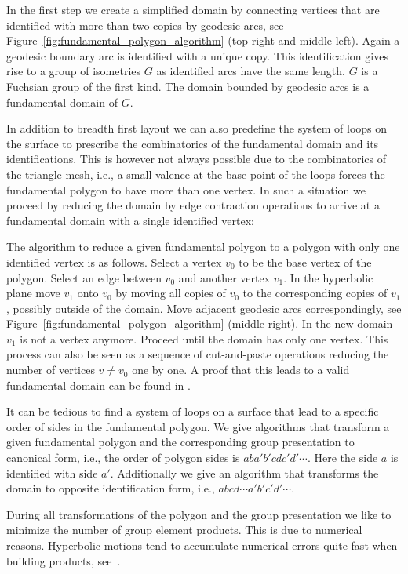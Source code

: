 \documentclass[Thesis]{subfiles}
\begin{document}
In the first step we create a simplified domain by connecting vertices that are identified with more than two copies by geodesic arcs, see Figure~\ref{fig:fundamental_polygon_algorithm} (top-right and middle-left). 
Again a geodesic boundary arc is identified with a unique copy. 
This identification gives rise to a group of isometries $G$ as identified arcs have the same length. 
$G$ is a Fuchsian group of the first kind. 
The domain bounded by geodesic arcs is a fundamental domain of $G$.

In addition to breadth first layout we can also predefine the system of loops on the surface to prescribe the combinatorics of the fundamental domain and its identifications. 
This is however not always possible due to the combinatorics of the triangle mesh, i.e., a small valence at the base point of the loops forces the fundamental polygon to have more than one vertex. 
In such a situation we proceed by reducing the domain by edge contraction operations to arrive at a fundamental domain with a single identified vertex:

The algorithm to reduce a given fundamental polygon to a polygon with only one identified vertex is as follows. 
Select a vertex $v_0$ to be the base vertex of the polygon. 
Select an edge between $v_0$ and another vertex $v_1$. 
In the hyperbolic plane move $v_1$ onto $v_0$ by moving all copies of $v_0$ to the corresponding copies of $v_1$, possibly outside of the domain. 
Move adjacent geodesic arcs correspondingly, see Figure~\ref{fig:fundamental_polygon_algorithm} (middle-right). 
In the new domain $v_1$ is not a vertex anymore. 
Proceed until the domain has only one vertex. 
This process can also be seen as a sequence of cut-and-paste operations reducing the number of vertices $v\neq v_0$ one by one. 
A proof that this leads to a valid fundamental domain can be found in \cite[p. 48]{Jost2007}.

It can be tedious to find a system of loops on a surface that lead to a specific order of sides in the fundamental polygon. 
We give algorithms that transform a given fundamental polygon and the corresponding group presentation to canonical form, i.e., the order of polygon sides is $aba'b'cdc'd'\cdots$. 
Here the side $a$ is identified with side $a'$. 
Additionally we give an algorithm that transforms the domain to opposite identification form, i.e., $abcd\cdots a'b'c'd'\cdots$.

During all transformations of the polygon and the group presentation we like to minimize the number of group element products. 
This is due to numerical reasons. 
Hyperbolic motions tend to accumulate numerical errors quite fast when building products, see~\cite{Floyd2002}.
\end{document}
